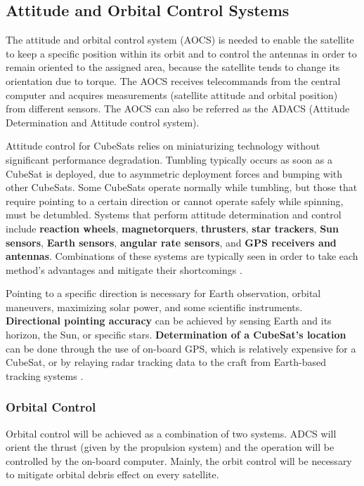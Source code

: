 \subsection{Attitude and Orbital Control Systems}
The attitude and orbital control system (AOCS) is needed to enable the satellite to keep a specific position within its orbit and to control the antennas in order to remain oriented to the assigned area, because the satellite tends to change its orientation due to torque. The AOCS receives telecommands from the central computer and acquires measurements (satellite attitude and orbital position) from different sensors. The AOCS can also be referred as the ADACS (Attitude Determination and Attitude control system).

Attitude control for CubeSats relies on miniaturizing technology without significant performance degradation. Tumbling typically occurs as soon as a CubeSat is deployed, due to asymmetric deployment forces and bumping with other CubeSats. Some CubeSats operate normally while tumbling, but those that require pointing to a certain direction or cannot operate safely while spinning, must be detumbled. Systems that perform attitude determination and control include \textbf{reaction wheels}, \textbf{magnetorquers}, \textbf{thrusters}, \textbf{star trackers}, \textbf{Sun sensors}, \textbf{Earth sensors}, \textbf{angular rate sensors}, and \textbf{GPS receivers and antennas}. Combinations of these systems are typically seen in order to take each method's advantages and mitigate their shortcomings \cite{Macdonald2014}. 

Pointing to a specific direction is necessary for Earth observation, orbital maneuvers, maximizing solar power, and some scientific instruments. \textbf{Directional pointing accuracy} can be achieved by sensing Earth and its horizon, the Sun, or specific stars. \textbf{Determination of a CubeSat's location} can be done through the use of on-board GPS, which is relatively expensive for a CubeSat, or by relaying radar tracking data to the craft from Earth-based tracking systems \cite{Macdonald2014}.

\subsubsection{Orbital Control}
Orbital control will be achieved as a combination of two systems. ADCS will orient the thrust (given by the propulsion system) and the operation will be controlled by the on-board computer. Mainly, the orbit control will be necessary to mitigate orbital debris effect on every satellite.

